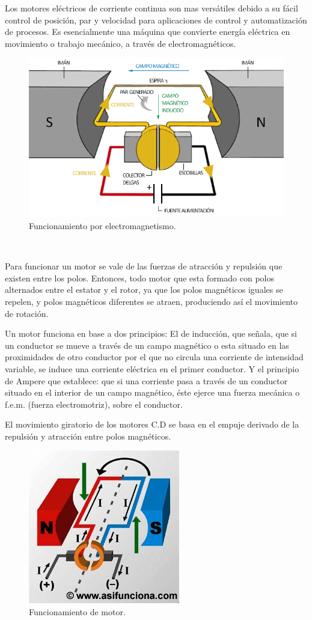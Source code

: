 \documentclass[12pt,letterpaper]{article}
\begin{document}
Los motores eléctricos de corriente continua son mas versátiles debido a su fácil control de posición, par y velocidad para aplicaciones de control y automatización de procesos. Es esencialmente una máquina que convierte energía eléctrica en movimiento o trabajo mecánico, a través de electromagnéticos.
\

\begin{figure}[h!]
\begin{center}
\includegraphics[scale=0.5]{images.png} 
\caption{Funcionamiento por electromagnetismo.}
\end{center}
\end{figure}


\

Para funcionar un motor se vale de las fuerzas de atracción y repulsión que existen entre los polos. Entonces, todo motor que esta formado con polos alternados entre el estator y el rotor, ya que los polos magnéticos iguales se repelen, y polos magnéticos diferentes se atraen, produciendo así el movimiento de rotación.
\

Un motor funciona en base a dos principios: El de inducción, que señala, que si un conductor se mueve a través de un campo magnético o esta situado en las proximidades de otro conductor por el que no circula una corriente de intensidad variable, se induce una corriente eléctrica en el primer conductor. Y el principio de Ampere que establece: que si una corriente pasa a través de un conductor situado en el interior de un campo magnético, éste ejerce una fuerza mecánica o f.e.m. (fuerza electromotriz), sobre el conductor.
\

\newpage

El movimiento giratorio de los motores C.D se basa en el empuje derivado de la repulsión y atracción entre polos magnéticos.
\ 

\begin{figure}[h!]
\begin{center}
\includegraphics[scale=0.6]{Motor.jpg} 
\caption{Funcionamiento de motor.} 
\end{center}
\end{figure}
\end{document}
